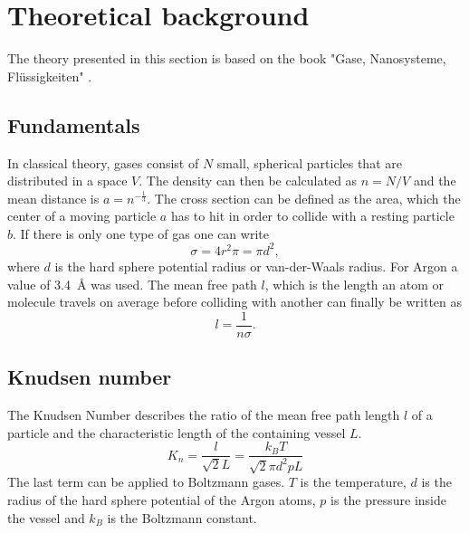 \documentclass[a4paper,10pt]{article}
\begin{document}
\section{Theoretical background}
The theory presented in this section is based on the book "Gase, Nanosysteme, Flüssigkeiten" \cite{bergmann}. 

\subsection{Fundamentals}
In classical theory, gases consist of $N$ small, spherical particles  that are distributed in a space $V$. The density can then be calculated as $n = N / V$ and the mean distance is $a = n^{-\frac{1}{3}}$. The cross section can be defined as the area, which the center of a moving particle $a$ has to hit in order to collide with a resting particle $b$. If there is only one type of gas one can write 
\begin{equation}
	\sigma = 4 r^2 \pi =\pi d^2,
\end{equation}
where $d$ is the hard sphere potential radius or van-der-Waals radius. For Argon a value of \SI{3.4}{\angstrom} \cite{bergmann} was used. The mean free path $l$, which is the length an atom or molecule travels on average before colliding with another can finally be written as 
\begin{equation}
	l = \frac{1}{n \sigma}. 
\end{equation}
\subsection{Knudsen number}
The Knudsen Number describes the ratio of the mean free path length $l$ of a particle and the characteristic length of the containing vessel $L$.
\begin{equation}
  K_n = \frac{l}{\sqrt{2} L} = \frac{k_B T }{\sqrt{2} \pi d^2 p L}
\end{equation}
The last term can be applied to Boltzmann gases. $T$ is the temperature, $d$ is the radius of the hard sphere potential of the Argon atoms, $p$ is the pressure inside the vessel and $k_B$ is the Boltzmann constant.
\end{document}
